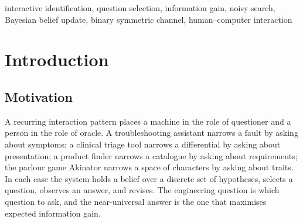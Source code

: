 \documentclass[conference]{IEEEtran}
\begin{document}
\begin{abstract}
distinguishing objective, semi-objective and subjective attributes is
sufficient to instantiate it. We describe a paired evaluation protocol over
homogeneous and heterogeneous noise, including the restricted-attribute
baseline that most directly threatens the method. On a 79,803-song catalogue,
per-attribute maximum information gain correlates negatively with annotated
reliability (Spearman $\rho=-0.44$, $p=0.054$ at native binning; $\rho=-0.61$,
$p=0.004$ at four bins), confirming the hypothesised bias. At the pre-registered
primary comparison (heterogeneous noise, $\lambda=1.0$), RAIG-tiered reaches
7.9\% top-1 accuracy at a fixed $T=20$ against 2.1\% for IG+soft-uniform and
0.4\% for the restricted-attribute baseline (exact McNemar $p=1.8\times10^{-9}$
and $p=2.2\times10^{-18}$ respectively), and is statistically indistinguishable
from the oracle. The advantage is noise-level dependent: RAIG-tiered trails
IG+soft-uniform at $\lambda\le0.5$ and in the noise-free control, and leads
only once the true noise is at or above the level its tiered annotation
assumes -- a limitation we report rather than obscure. A coarser two-tier
annotation recovers 82.7\% of the oracle--uniform accuracy gap.
\end{abstract}

\begin{IEEEkeywords}
interactive identification, question selection, information gain, noisy search,
Bayesian belief update, binary symmetric channel, human--computer interaction
\end{IEEEkeywords}

\section{Introduction}

\subsection{Motivation}

A recurring interaction pattern places a machine in the role of questioner and
a person in the role of oracle. A troubleshooting assistant narrows a fault by
asking about symptoms; a clinical triage tool narrows a differential by asking
about presentation; a product finder narrows a catalogue by asking about
requirements; the parlour game Akinator narrows a space of characters by asking
about traits. In each case the system holds a belief over a discrete set of
hypotheses, selects a question, observes an answer, and revises. The engineering
question is which question to ask, and the near-universal answer is the one that
maximises expected information gain.
\end{document}
